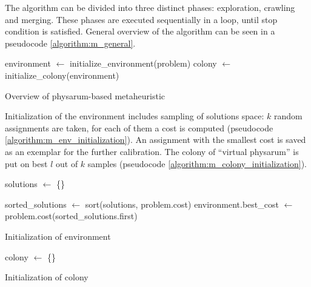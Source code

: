 \documentclass[english,a4paper,twoside]{ppfcmthesis}
\begin{document}
The algorithm can be divided into three distinct phases: exploration, crawling and merging. These phases are executed sequentially in a loop, until stop condition is satisfied. General overview of the algorithm can be seen in a pseudocode \ref{algorithm:m_general}. 

\begin{algorithm}[H]
  \BlankLine

  environment $\leftarrow$ initialize\_environment(problem)\;
  colony $\leftarrow$ initialize\_colony(environment)\;


  \;

  \caption{Overview of physarum-based metaheuristic}
  \label{algorithm:m_general}
\end{algorithm}

Initialization of the environment includes sampling of solutions space: $k$ random assignments are taken, for each of them a cost is computed (pseudocode \ref{algorithm:m_env_initialization}). An assignment with the smallest cost is saved as an exemplar for the further calibration.  The colony of ``virtual physarum'' is put on best $l$ out of $k$ samples (pseudocode \ref{algorithm:m_colony_initialization}).

\begin{algorithm}
  \BlankLine

  solutions $\leftarrow$ \{\}\;

  sorted\_solutions $\leftarrow$ sort(solutions, problem.cost)\;
  environment.best\_cost $\leftarrow$ problem.cost(sorted\_solutions.first)\;
  
  \;

  \caption{Initialization of environment}
  \label{algorithm:m_env_initialization}
\end{algorithm}

\begin{algorithm}
  \BlankLine

  colony $\leftarrow$ \{\}\;
  \;

  \caption{Initialization of colony}
  \label{algorithm:m_colony_initialization}
\end{algorithm}
\end{document}
